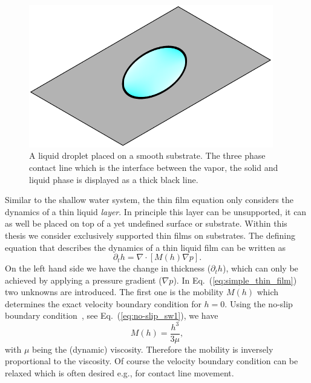 \begin{figure}
    \centering
    \includegraphics[width=0.95\textwidth]{graphics/contact_line.pdf}
    \caption{A liquid droplet placed on a smooth substrate.
    The three phase contact line which is the interface between the vapor, the solid and liquid phase is displayed as a thick black line.}
    \label{fig:contact_line_drop}
\end{figure}
Similar to the shallow water system, the thin film equation only considers the dynamics of a thin liquid \textit{layer}. 
In principle this layer can be unsupported, it can as well be placed on top of a yet undefined surface or substrate.
Within this thesis we consider exclusively supported thin films on substrates.
The defining equation that describes the dynamics of a thin liquid film can be written as~\cite{thielePatternedDepositionMoving2014, oronLongscaleEvolutionThin1997, crasterDynamicsStabilityThin2009, bonnWettingSpreading2009} 
\begin{equation}\label{eq:simple_thin_film}
    \partial_t h = \nabla\cdot\left[M(h)\nabla p\right].
\end{equation}
On the left hand side we have the change in thickness ($\partial_t h$), which can only be achieved by applying a pressure gradient ($\nabla p$).
In Eq.~(\ref{eq:simple_thin_film}) two unknowns are introduced.
The first one is the mobility $M(h)$ which determines the exact velocity boundary condition for $h=0$.
Using the no-slip boundary condition~\cite{beckerThinfilmEquationRecent2005}, see Eq.~(\ref{eq:no-slip_sw1}), we have 
\begin{equation}\label{eq:no-slip-mobility}
    M(h) = \frac{h^3}{3\mu},
\end{equation}
with $\mu$ being the (dynamic) viscosity. 
Therefore the mobility is inversely proportional to the viscosity.
Of course the velocity boundary condition can be relaxed which is often desired e.g., for contact line movement.

